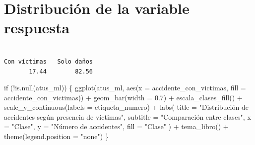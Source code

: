 \documentclass[
  spanish,
  11pt,
  letterpaper,
]{book}
\newenvironment{Shaded}{}{}
\newcommand{\AttributeTok}[1]{\textcolor[rgb]{0.84,0.23,0.29}{#1}}
\newcommand{\ControlFlowTok}[1]{\textcolor[rgb]{0.84,0.23,0.29}{#1}}
\newcommand{\DecValTok}[1]{\textcolor[rgb]{0.00,0.36,0.77}{#1}}
\newcommand{\FloatTok}[1]{\textcolor[rgb]{0.00,0.36,0.77}{#1}}
\newcommand{\FunctionTok}[1]{\textcolor[rgb]{0.44,0.26,0.76}{#1}}
\newcommand{\NormalTok}[1]{\textcolor[rgb]{0.14,0.16,0.18}{#1}}
\newcommand{\OtherTok}[1]{\textcolor[rgb]{0.44,0.26,0.76}{#1}}
\newcommand{\SpecialCharTok}[1]{\textcolor[rgb]{0.00,0.36,0.77}{#1}}
\newcommand{\StringTok}[1]{\textcolor[rgb]{0.01,0.18,0.38}{#1}}
\newcounter{none} %
\begin{document}
\section{Distribución de la variable
respuesta}\label{distribuciuxf3n-de-la-variable-respuesta}

\begin{Shaded}
\end{Shaded}

\begin{verbatim}

Con víctimas   Solo daños 
       17.44        82.56 
\end{verbatim}

\begin{Shaded}
\begin{Highlighting}[]
\ControlFlowTok{if}\NormalTok{ (}\SpecialCharTok{!}\FunctionTok{is.null}\NormalTok{(atus\_ml)) \{}
  \FunctionTok{ggplot}\NormalTok{(atus\_ml, }\FunctionTok{aes}\NormalTok{(}\AttributeTok{x =}\NormalTok{ accidente\_con\_victimas, }\AttributeTok{fill =}\NormalTok{ accidente\_con\_victimas)) }\SpecialCharTok{+}
    \FunctionTok{geom\_bar}\NormalTok{(}\AttributeTok{width =} \FloatTok{0.7}\NormalTok{) }\SpecialCharTok{+}
    \FunctionTok{escala\_clases\_fill}\NormalTok{() }\SpecialCharTok{+}
    \FunctionTok{scale\_y\_continuous}\NormalTok{(}\AttributeTok{labels =}\NormalTok{ etiqueta\_numero) }\SpecialCharTok{+}
    \FunctionTok{labs}\NormalTok{(}
      \AttributeTok{title =} \StringTok{"Distribución de accidentes según presencia de víctimas"}\NormalTok{,}
      \AttributeTok{subtitle =} \StringTok{"Comparación entre clases"}\NormalTok{,}
      \AttributeTok{x =} \StringTok{"Clase"}\NormalTok{,}
      \AttributeTok{y =} \StringTok{"Número de accidentes"}\NormalTok{,}
      \AttributeTok{fill =} \StringTok{"Clase"}
\NormalTok{    ) }\SpecialCharTok{+}
    \FunctionTok{tema\_libro}\NormalTok{() }\SpecialCharTok{+}
    \FunctionTok{theme}\NormalTok{(}\AttributeTok{legend.position =} \StringTok{"none"}\NormalTok{)}
\NormalTok{\}}
\end{Highlighting}
\end{Shaded}
\end{document}
